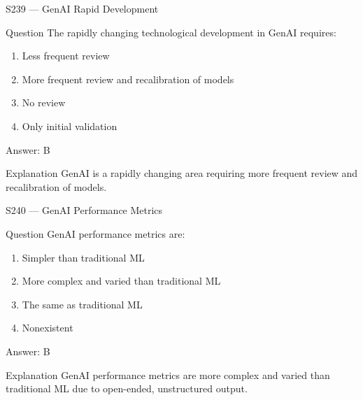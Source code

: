 \documentclass[aspectratio=169,8pt]{beamer}
\begin{document}
	\begin{frame}{S239 --- GenAI Rapid Development}
		\begin{block}{Question}
			The rapidly changing technological development in GenAI requires:
			\begin{enumerate}
				\item Less frequent review
				\item More frequent review and recalibration of models
				\item No review
				\item Only initial validation
			\end{enumerate}
		\end{block}
		\begin{exampleblock}{Answer: B}\end{exampleblock}
		\begin{block}{Explanation}
			GenAI is a rapidly changing area requiring more frequent review and recalibration of models.
		\end{block}
	\end{frame}
	
	\begin{frame}{S240 --- GenAI Performance Metrics}
		\begin{block}{Question}
			GenAI performance metrics are:
			\begin{enumerate}
				\item Simpler than traditional ML
				\item More complex and varied than traditional ML
				\item The same as traditional ML
				\item Nonexistent
			\end{enumerate}
		\end{block}
		\begin{exampleblock}{Answer: B}\end{exampleblock}
		\begin{block}{Explanation}
			GenAI performance metrics are more complex and varied than traditional ML due to open-ended, unstructured output.
		\end{block}
	\end{frame}
	
\end{document}
